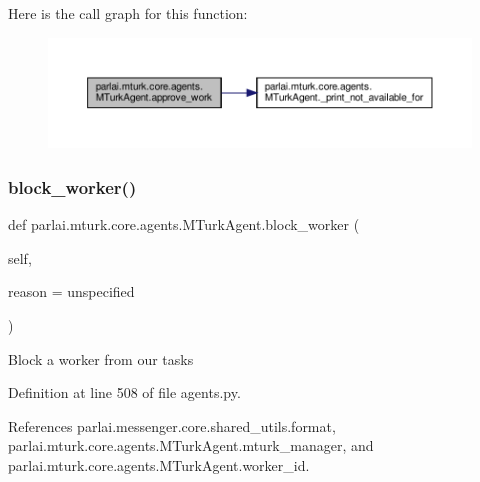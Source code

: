 Here is the call graph for this function\+:
\nopagebreak
\begin{figure}[H]
\begin{center}
\leavevmode
\includegraphics[width=350pt]{classparlai_1_1mturk_1_1core_1_1agents_1_1MTurkAgent_a5dad7b198d999ce61833a8b255b5f6d3_cgraph}
\end{center}
\end{figure}
\mbox{\label{classparlai_1_1mturk_1_1core_1_1agents_1_1MTurkAgent_a3c836286ed2f5fedce11c410a437208c}} 
\subsubsection{\texorpdfstring{block\+\_\+worker()}{block\_worker()}}
{\footnotesize\ttfamily def parlai.\+mturk.\+core.\+agents.\+M\+Turk\+Agent.\+block\+\_\+worker (\begin{DoxyParamCaption}\item[{}]{self,  }\item[{}]{reason = {\ttfamily \textquotesingle{}unspecified\textquotesingle{}} }\end{DoxyParamCaption})}

\begin{DoxyVerb}Block a worker from our tasks\end{DoxyVerb}
 

Definition at line 508 of file agents.\+py.



References parlai.\+messenger.\+core.\+shared\+\_\+utils.\+format, parlai.\+mturk.\+core.\+agents.\+M\+Turk\+Agent.\+mturk\+\_\+manager, and parlai.\+mturk.\+core.\+agents.\+M\+Turk\+Agent.\+worker\+\_\+id.

\mbox{\label{classparlai_1_1mturk_1_1core_1_1agents_1_1MTurkAgent_af49362633aadb0306a5350dc9700e9b5}} 

